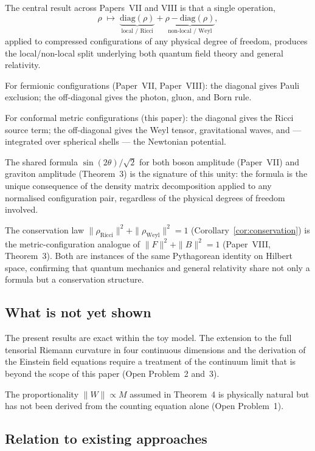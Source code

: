 \documentclass[11pt]{article}
\begin{document}
The central result across Papers~VII and VIII is that a single
operation,
\[
  \rho \;\longmapsto\;
  \underbrace{\mathrm{diag}(\rho)}_{\text{local / Ricci}}
  +
  \underbrace{\rho - \mathrm{diag}(\rho)}_{\text{non-local / Weyl}},
\]
applied to compressed configurations of any physical degree of
freedom, produces the local/non-local split underlying both quantum
field theory and general relativity.

For fermionic configurations (Paper~VII, Paper~VIII): the diagonal
gives Pauli exclusion; the off-diagonal gives the photon, gluon, and
Born rule.

For conformal metric configurations (this paper): the diagonal gives
the Ricci source term; the off-diagonal gives the Weyl tensor,
gravitational waves, and --- integrated over spherical shells --- the
Newtonian potential.

The shared formula $\sin(2\theta)/\sqrt{2}$ for both boson amplitude
(Paper~VII) and graviton amplitude (Theorem~3) is the signature of
this unity: the formula is the unique consequence of the density
matrix decomposition applied to any normalised configuration pair,
regardless of the physical degrees of freedom involved.

The conservation law $\|\rho_{\mathrm{Ricci}}\|^2 +
\|\rho_{\mathrm{Weyl}}\|^2 = 1$ (Corollary~\ref{cor:conservation})
is the metric-configuration analogue of $\|F\|^2 + \|B\|^2 = 1$
(Paper~VIII, Theorem~3).
Both are instances of the same Pythagorean identity on Hilbert space,
confirming that quantum mechanics and general relativity share not
only a formula but a conservation structure.

\subsection{What is not yet shown}

The present results are exact within the toy model.
The extension to the full tensorial Riemann curvature in four
continuous dimensions and the derivation of the Einstein field
equations require a treatment of the continuum limit that is beyond
the scope of this paper (Open Problem~2 and~3).

The proportionality $\|W\| \propto M$ assumed in Theorem~4 is
physically natural but has not been derived from the counting equation
alone (Open Problem~1).

\subsection{Relation to existing approaches}
\end{document}
